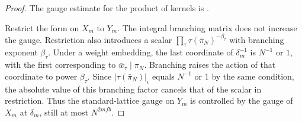 \begin{proof}
The gauge estimate for the product of kernels is .

Restrict the form on $X_m$ to $Y_m$. The integral branching matrix does not increase the gauge. Restriction also introduces a scalar $\prod_\tau\tau(\bar\pi_N)^{-\beta_\tau}$ with branching exponent $\beta_\tau$. Under a weight embedding, the last coordinate of $\delta_m^{-1}$ is $N^{-1}$ or $1$, with the first corresponding to $\bar w_\tau\mid\pi_N$. Branching raises the action of that coordinate to power $\beta_\tau$. Since $|\tau(\bar\pi_N)|_\iota$ equals $N^{-1}$ or $1$ by the same condition, the absolute value of this branching factor cancels that of the scalar in restriction. Thus the standard-lattice gauge on $Y_m$ is controlled by the gauge of $X_m$ at $\delta_m$, still at most $N^{2mfb}$.
\end{proof}

